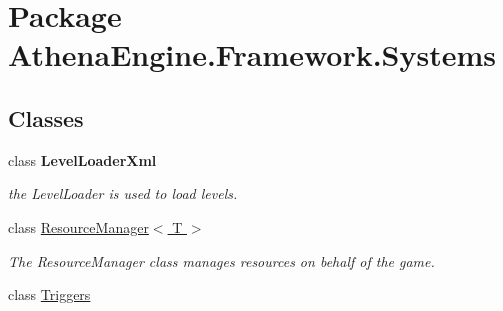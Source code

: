 \hypertarget{namespace_athena_engine_1_1_framework_1_1_systems}{\section{Package Athena\-Engine.\-Framework.\-Systems}
\label{namespace_athena_engine_1_1_framework_1_1_systems}
}
\subsection*{Classes}
\begin{DoxyCompactItemize}
\item 
class {\bfseries Level\-Loader\-Xml}
\begin{DoxyCompactList}\small\item\em the Level\-Loader is used to load levels. \end{DoxyCompactList}\item 
class \hyperlink{class_athena_engine_1_1_framework_1_1_systems_1_1_resource_manager_3_01_t_01_4}{Resource\-Manager$<$ T $>$}
\begin{DoxyCompactList}\small\item\em The Resource\-Manager class manages resources on behalf of the game. \end{DoxyCompactList}\item 
class \hyperlink{class_athena_engine_1_1_framework_1_1_systems_1_1_triggers}{Triggers}
\end{DoxyCompactItemize}
